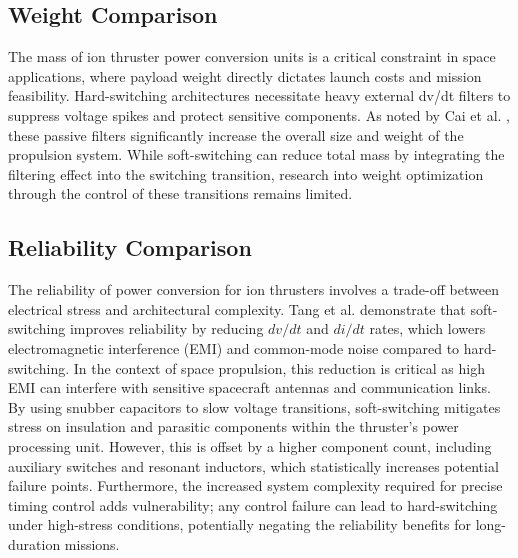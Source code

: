 \subsection{Weight Comparison}
The mass of ion thruster power conversion units is a critical constraint in space applications, where payload weight directly dictates launch costs and mission feasibility. Hard-switching architectures necessitate heavy external dv/dt filters to suppress voltage spikes and protect sensitive components. As noted by Cai et al. \cite{cai2019voltage}, these passive filters significantly increase the overall size and weight of the propulsion system. While soft-switching can reduce total mass by integrating the filtering effect into the switching transition, research into weight optimization through the control of these transitions remains limited.

\subsection{Reliability Comparison}
The reliability of power conversion for ion thrusters involves a trade-off between electrical stress and architectural complexity. Tang et al. \cite{tang1998emi} demonstrate that soft-switching improves reliability by reducing $dv/dt$ and $di/dt$ rates, which lowers electromagnetic interference (EMI) and common-mode noise compared to hard-switching. In the context of space propulsion, this reduction is critical as high EMI can interfere with sensitive spacecraft antennas and communication links. By using snubber capacitors to slow voltage transitions, soft-switching mitigates stress on insulation and parasitic components within the thruster's power processing unit. However, this is offset by a higher component count, including auxiliary switches and resonant inductors, which statistically increases potential failure points. %
Furthermore, the increased system complexity required for precise timing control adds vulnerability; any control failure can lead to hard-switching under high-stress conditions, potentially negating the reliability benefits for long-duration missions.